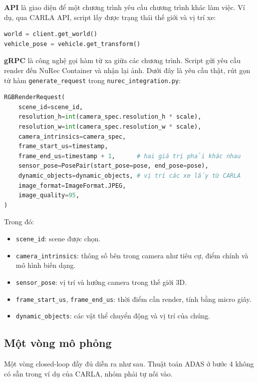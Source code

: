 \textbf{API} là giao diện để một chương trình yêu cầu chương trình khác làm việc.
Ví dụ, qua CARLA API, script lấy được trạng thái thế giới và vị trí xe:

\begin{lstlisting}[language=Python, numbers=none, caption={Đọc trạng thái qua CARLA API}]
world = client.get_world()
vehicle_pose = vehicle.get_transform()
\end{lstlisting}

\textbf{gRPC} là công nghệ gọi hàm từ xa giữa các chương trình.
Script gửi yêu cầu render đến NuRec Container và nhận lại ảnh.
Dưới đây là yêu cầu thật, rút gọn từ hàm \texttt{generate\_request} trong \texttt{nurec\_integration.py}:

\begin{lstlisting}[language=Python, numbers=none, texcl=true, caption={Yêu cầu render gửi đến NuRec (rút gọn từ mã nguồn CARLA)}]
RGBRenderRequest(
    scene_id=scene_id,
    resolution_h=int(camera_spec.resolution_h * scale),
    resolution_w=int(camera_spec.resolution_w * scale),
    camera_intrinsics=camera_spec,
    frame_start_us=timestamp,
    frame_end_us=timestamp + 1,      # hai giá trị phải khác nhau
    sensor_pose=PosePair(start_pose=pose, end_pose=pose),
    dynamic_objects=dynamic_objects, # vị trí các xe lấy từ CARLA
    image_format=ImageFormat.JPEG,
    image_quality=95,
)
\end{lstlisting}

Trong đó:
\begin{itemize}
  \item \texttt{scene\_id}: scene được chọn.
  \item \texttt{camera\_intrinsics}: thông số bên trong camera như tiêu cự, điểm chính và mô hình biến dạng.
  \item \texttt{sensor\_pose}: vị trí và hướng camera trong thế giới 3D.
  \item \texttt{frame\_start\_us}, \texttt{frame\_end\_us}: thời điểm cần render, tính bằng micro giây.
  \item \texttt{dynamic\_objects}: các vật thể chuyển động và vị trí của chúng.
\end{itemize}

\subsection{Một vòng mô phỏng}

Một vòng closed-loop đầy đủ diễn ra như sau. Thuật toán ADAS ở bước 4 không có sẵn trong ví dụ của CARLA, nhóm phải tự nối vào.

